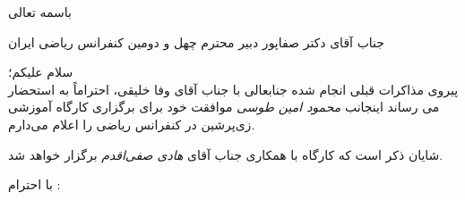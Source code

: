 \documentclass[10pt,a5paper]{letter}
\begin{document}
\begin{letter}{\centerline{باسمه تعالی}}
\opening{جناب آقای دکتر صفاپور دبیر محترم چهل و دومین کنفرانس ریاضی ایران}

سلام علیکم؛\\

پیروی مذاکرات قبلی انجام شده جنابعالی با جناب آقای وفا خلیقی، احتراماً به استحضار می رساند اینجانب \textit{ محمود امین طوسی}
 موافقت خود برای برگزاری کارگاه آموزشی زی‌پرشین در کنفرانس ریاضی را اعلام می‌دارم.

شایان ذکر است که کارگاه با همکاری جناب آقای \textit{هادی صفی‌اقدم} برگزار خواهد شد.

\closing{با احترام :}

\end{letter}
\end{document}
